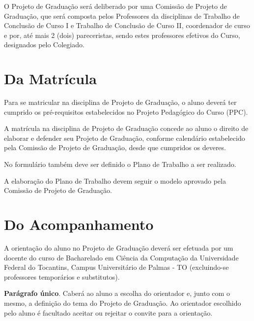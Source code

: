 \documentclass[12pt,geral,titlewithdate]{uftdocs}
\begin{document}
\artigo O Projeto de Graduação será deliberado por uma Comissão de Projeto de Graduação, que será composta pelos Professores da disciplinas de Trabalho de Conclusão de Curso I e Trabalho de Conclusão de Curso II, coordenador de curso e por, até mais 2 (dois) pareceristas, sendo estes professores efetivos do Curso, designados pelo Colegiado.

\chapter{Da Matrícula}
\label{chap:tecnicas}

\artigo Para se matricular na disciplina de Projeto de Graduação, o aluno deverá ter cumprido os pré-requisitos estabelecidos no Projeto Pedagógico do Curso (PPC).

\begin{paragrafos}

\paragrafo A matrícula na disciplina de Projeto de Graduação concede ao aluno o direito de elaborar e defender seu Projeto de Graduação, conforme calendário estabelecido pela Comissão de Projeto de Graduação, desde que cumpridos os deveres.


\paragrafo No formulário também deve ser definido o Plano de Trabalho a ser realizado.

\end{paragrafos}

\artigo  A elaboração do Plano de Trabalho devem seguir o modelo aprovado pela Comissão de Projeto de Graduação. 

\chapter{Do Acompanhamento}
\label{chap:tecnicas}

\artigo A orientação do aluno no Projeto de Graduação deverá ser efetuada por um docente do curso de Bacharelado em Ciência da Computação da Universidade Federal do Tocantins, Campus Universitário de Palmas - TO (excluindo-se professores temporários e substitutos).

{\bf Parágrafo único}. Caberá ao aluno a escolha do orientador e, junto com o mesmo, a definição do tema do Projeto de Graduação. Ao orientador escolhido pelo aluno é facultado aceitar ou rejeitar o convite para a orientação.
\end{document}
